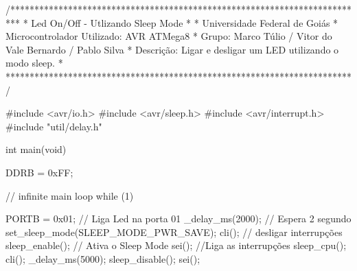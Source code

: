 \begin{codigo}[caption = {Led On/Off in Sleep Mode}, label={codigo: Led On/Off with Slep Mode},language=C, breaklines=true]

 
 /**************************************************************************
 *      Led On/Off - Utlizando Sleep Mode
 *
 * Universidade Federal de Goiás
 * Microcontrolador Utilizado: AVR ATMega8
 * Grupo: Marco Túlio / Vitor do Vale Bernardo / Pablo Silva
 * Descrição: Ligar e desligar um LED utilizando o modo sleep.
 * 
 ************************************************************************/

#include <avr/io.h>
#include <avr/sleep.h>
#include <avr/interrupt.h>
#include "util/delay.h"

int main(void)
{
	DDRB = 0xFF;

   // infinite main loop
   while (1)
   {
	
	PORTB = 0x01; //  Liga Led na porta 01
	_delay_ms(2000); // Espera 2 segundo
	set_sleep_mode(SLEEP_MODE_PWR_SAVE);
	cli(); 	// desligar interrupções
	sleep_enable();	 // Ativa o Sleep Mode
	sei(); //Liga as interrupções
	sleep_cpu(); 
	cli();
	_delay_ms(5000);
	sleep_disable();
	sei();
	
   }
   
}

\end{codigo}